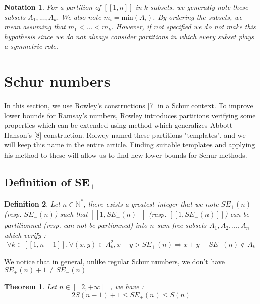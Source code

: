 \documentclass{article}
\newtheorem{definition}{Definition}[section]
\newtheorem{notation}[definition]{Notation}
\newtheorem{theorem}{Theorem}[section]
\newtheorem{computational theorem}{Computational Theorem}[section]
\begin{document}
\begin{notation}
For a partition of \([\![1, n]\!]\) in \(k\) subsets, we generally note these subsets \(A_1, ..., A_k\). We also note \(m_i = \text{min}(A_i)\). 
By ordering the subsets, we mean assuming that \(m_1 < ... < m_k\). However, if not specified we do not make this hypothesis since we 
do not always consider partitions in which every subset plays a symmetric role.
\end{notation}



\section{Schur numbers}

\qquad In this section, we use Rowley's constructions [7] in a Schur context. To improve lower bounds for Ramsay's numbers, Rowley 
introduces partitions verifying some properties which can be extended using method which generalizes Abbott-Hanson's [8] construction. 
Rolwey named these partitions "templates", and we will keep this name in the entire article. Finding suitable templates and applying his 
method to these will allow us to find new lower bounds for Schur methods.

\subsection{Definition of SE\(_+\)}

\begin{definition}
Let \( n \in \mathbb{N}^*\), there exists a greatest integer that we note \(SE_+(n)\) (resp. \(SE_-(n)\)) such that \( [\![1, SE_+(n)]\!]\) 
(resp. \( [\![1, SE_-(n)]\!]\)) can be partitionned (resp. can not be partionned) into \(n\) sum-free subsets \(A_1, A_2, ..., A_n\) which verify :
\[
\forall k \in [\![1, n-1]\!], \forall (x,y) \in A_k^2, x+y > SE_+(n)
\Longrightarrow x+y-SE_+(n) \notin A_k
\]
\end{definition}
We notice that in general, unlike regular Schur numbers, we don't have \(SE_+(n) + 1 \neq SE_-(n)\)

\begin{theorem}
Let \(n \in [\![2, +\infty]\!]\), we have :
\[
2S(n-1)+1 \leqslant SE_+(n) \leqslant S(n)
\]
\end{theorem}


\subsection{}
\end{document}
